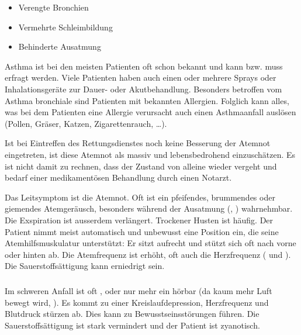 {{\begin{itemize}
  \item Verengte Bronchien
  \item Vermehrte Schleimbildung
  \item Behinderte Ausatmung
\end{itemize}
}
{}
{}
{}





Asthma ist bei den meisten Patienten oft schon bekannt und
kann bzw. muss erfragt werden. Viele Patienten haben auch
einen oder mehrere Sprays oder Inhalationsgeräte zur Dauer-
oder Akutbehandlung. 
Besonders betroffen vom Asthma bronchiale sind Patienten
mit bekannten Allergien. Folglich kann alles, was bei dem
Patienten eine Allergie verursacht auch einen Asthmaanfall
auslösen (Pollen, Gräser, Katzen, Zigarettenrauch, \ldots). 

Ist bei Eintreffen des Rettungsdienstes noch keine
Besserung der Atemnot eingetreten, ist diese Atemnot als
massiv und lebensbedrohend einzuschätzen. Es ist nicht
damit zu rechnen, dass der Zustand von alleine wieder
vergeht und bedarf einer medikamentösen Behandlung durch einen
Notarzt. 



{%
Das Leitsymptom ist die Atemnot. Oft ist ein pfeifendes,
brummendes oder giemendes Atemgeräusch, besonders während
der Ausatmung (, ) wahrnehmbar. Die Exspiration ist ausserdem
verlängert. Trockener Husten ist häufig.
Der Patient nimmt meist automatisch und unbewusst eine
Position ein, die seine Atemhilfsmuskulatur unterstützt: Er
sitzt aufrecht und stützt sich oft nach vorne oder hinten
ab.
Die Atemfrequenz ist erhöht, oft auch die Herzfrequenz
( und ). Die Sauerstoffsättigung
kann erniedrigt sein.

\subparagraph{}

Im schweren Anfall ist oft , oder nur mehr ein
 hörbar (da kaum mehr Luft bewegt
wird, ). Es kommt zu einer
Kreislaufdepression, Herzfrequenz und Blutdruck stürzen ab.
Dies kann zu Bewusstseinsstörungen führen. Die
Sauerstoffsättigung ist stark vermindert und der Patient ist
zyanotisch.


}}

